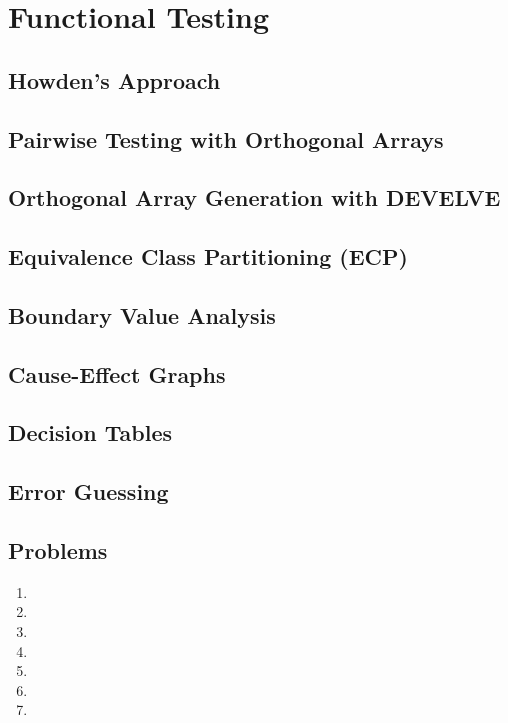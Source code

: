 \chapter{Functional Testing}
\section{Howden’s Approach}
\section{Pairwise Testing with Orthogonal Arrays}
\section{Orthogonal Array Generation with DEVELVE}
\section{Equivalence Class Partitioning (ECP)}
\section{Boundary Value Analysis}
\section{Cause-Effect Graphs}
\section{Decision Tables}
\section{Error Guessing}
\section{Problems}
\begin{enumerate}
    \item 
    \item 
    \item 
    \item 
    \item 
    \item
    \item 
\end{enumerate}